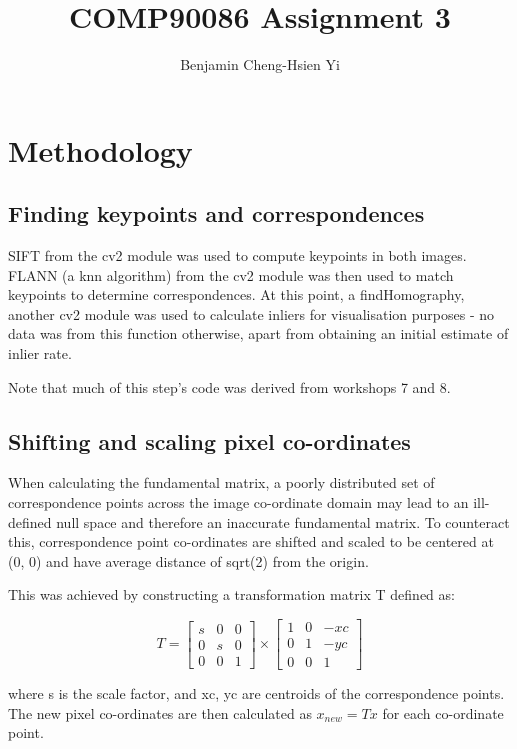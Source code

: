 \documentclass[10pt,a4paper]{article}
\begin{document}
\title{COMP90086 Assignment 3}
\author{Benjamin Cheng-Hsien Yi}

\section{Methodology}

\subsection*{Finding keypoints and correspondences}
SIFT from the cv2 module was used to compute keypoints in both images. FLANN (a knn algorithm) from the cv2 module was then used to match keypoints to determine correspondences. At this point, a findHomography, another cv2 module was used to calculate inliers for visualisation purposes - no data was from this function otherwise, apart from obtaining an initial estimate of inlier rate.

Note that much of this step's code was derived from workshops 7 and 8.

\subsection*{Shifting and scaling pixel co-ordinates}
When calculating the fundamental matrix, a poorly distributed set of correspondence points across the image co-ordinate domain may lead to an ill-defined null space and therefore an inaccurate fundamental matrix. To counteract this, correspondence point co-ordinates are shifted and scaled to be centered at (0, 0) and have average distance of sqrt(2) from the origin.

This was achieved by constructing a transformation matrix T defined as:

\begin{equation}
	T = 
	\begin{bmatrix}
		s & 0 & 0\\
		0 & s & 0\\
		0 & 0 & 1
	\end{bmatrix}
	\times
	\begin{bmatrix}
		1 & 0 & -xc\\
		0 & 1 & -yc\\
		0 & 0 & 1
	\end{bmatrix}
\end{equation}

where s is the scale factor, and xc, yc are centroids of the correspondence points. The new pixel co-ordinates are then calculated as $x_{new} = Tx$ for each co-ordinate point.
\end{document}
